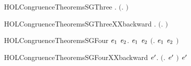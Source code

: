 \newcommand{\HOLCongruenceTheoremsSGTwo}{\UseVerbatim{HOLCongruenceTheoremsSGTwo}}
\begin{SaveVerbatim}{HOLCongruenceTheoremsSGThree}
\HOLTokenTurnstile{} \HOLSymConst{\HOLTokenForall{}} .   \HOLSymConst{\HOLTokenImp{}}  \ensuremath{(}\HOLTokenLambda{}. \HOLSymConst{\ensuremath{\ldotp}} \ensuremath{)}
\end{SaveVerbatim}
\newcommand{\HOLCongruenceTheoremsSGThree}{\UseVerbatim{HOLCongruenceTheoremsSGThree}}
\begin{SaveVerbatim}{HOLCongruenceTheoremsSGThreeXXbackward}
\HOLTokenTurnstile{} \HOLSymConst{\HOLTokenForall{}}.  \ensuremath{(}\HOLTokenLambda{}. \HOLConst{\ensuremath{\tau}}\HOLSymConst{\ensuremath{\ldotp}} \ensuremath{)} \HOLSymConst{\HOLTokenImp{}}  
\end{SaveVerbatim}
\newcommand{\HOLCongruenceTheoremsSGThreeXXbackward}{\UseVerbatim{HOLCongruenceTheoremsSGThreeXXbackward}}
\begin{SaveVerbatim}{HOLCongruenceTheoremsSGFour}
\HOLTokenTurnstile{} \HOLSymConst{\HOLTokenForall{}}\ensuremath{\HOLBoundVar{e}\sb{\mathrm{1}}} \ensuremath{\HOLBoundVar{e}\sb{\mathrm{2}}}.  \ensuremath{\HOLBoundVar{e}\sb{\mathrm{1}}} \HOLSymConst{\HOLTokenConj{}}  \ensuremath{\HOLBoundVar{e}\sb{\mathrm{2}}} \HOLSymConst{\HOLTokenImp{}}  \ensuremath{(}\HOLTokenLambda{}. \ensuremath{\HOLBoundVar{e}\sb{\mathrm{1}}}  \HOLSymConst{\ensuremath{+}} \ensuremath{\HOLBoundVar{e}\sb{\mathrm{2}}} \ensuremath{)}
\end{SaveVerbatim}
\newcommand{\HOLCongruenceTheoremsSGFour}{\UseVerbatim{HOLCongruenceTheoremsSGFour}}
\begin{SaveVerbatim}{HOLCongruenceTheoremsSGFourXXbackward}
\HOLTokenTurnstile{} \HOLSymConst{\HOLTokenForall{}} \ensuremath{\HOLBoundVar{e}\sp{\prime}}.  \ensuremath{(}\HOLTokenLambda{}.   \HOLSymConst{\ensuremath{+}} \ensuremath{\HOLBoundVar{e}\sp{\prime}} \ensuremath{)} \HOLSymConst{\HOLTokenImp{}}   \HOLSymConst{\HOLTokenConj{}}  \ensuremath{\HOLBoundVar{e}\sp{\prime}}
\end{SaveVerbatim}
\newcommand{\HOLCongruenceTheoremsSGFourXXbackward}{\UseVerbatim{HOLCongruenceTheoremsSGFourXXbackward}}
